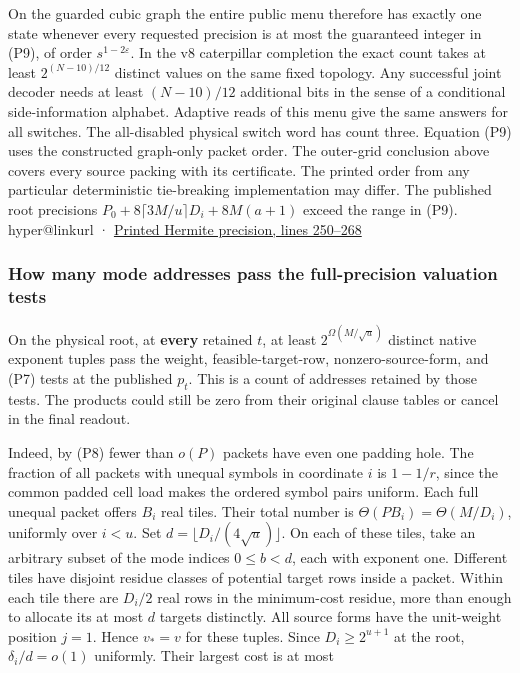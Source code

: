 \documentclass[11pt,a4paper]{article}
\makeatletter
\newcommand{\PaperSixCatalogue}[1]{\csname hyper@linkurl\endcsname{#1}{EVIDENCE_CATALOG.md}}
\newcommand{\PaperSixEvidence}[2]{\PaperSixCatalogue{#2}}
\makeatother
\begin{document}
On the guarded cubic graph the entire public menu therefore has exactly
one state whenever every requested precision is at most the guaranteed
integer in (P9), of order \(s^{1-2\varepsilon}\). In the v8 caterpillar
completion the exact count takes at least \(2^{(N-10)/12}\) distinct
values on the same fixed topology. Any successful joint decoder needs at
least \((N-10)/12\) additional bits in the sense of a conditional
side-information alphabet. Adaptive reads of this menu give the same
answers for all switches. The all-disabled physical switch word has
count three. Equation (P9) uses the constructed graph-only packet order.
The outer-grid conclusion above covers every source packing with its
certificate. The printed order from any particular deterministic
tie-breaking implementation may differ. The published root precisions
\(P_0+8\lceil3M/u\rceil D_i+8M(a+1)\) exceed the range in (P9).
\PaperSixEvidence{evidence/research_v8/applications/pooled_menu_barrier.md}{Range of
exact physical counts} ·
\href{https://github.com/openai/math/blob/main/preprints/The-Exponential-Time-Hypothesis-is-False-October-25-2026/build/quantitative-contraction.tex\#L250}{Printed
Hermite precision, lines 250--268}

\subsubsection{How many mode addresses pass the full-precision valuation
tests}\label{v9-how-many-mode-addresses-pass-the-full-precision-valuation-tests}

On the physical root, at \textbf{every} retained \(t\), at least
\(2^{\Omega(M/\sqrt{u})}\) distinct native exponent tuples pass the
weight, feasible-target-row, nonzero-source-form, and (P7) tests at the
published \(p_t\). This is a count of addresses retained by those tests.
The products could still be zero from their original clause tables or
cancel in the final readout.

Indeed, by (P8) fewer than \(o(P)\) packets have even one padding hole.
The fraction of all packets with unequal symbols in coordinate \(i\) is
\(1-1/r\), since the common padded cell load makes the ordered symbol
pairs uniform. Each full unequal packet offers \(B_i\) real tiles. Their
total number is \(\Theta(PB_i)=\Theta(M/D_i)\), uniformly over \(i<u\).
Set \(d=\lfloor D_i/(4\sqrt u)\rfloor\). On each of these tiles, take an
arbitrary subset of the mode indices \(0\le b<d\), each with exponent
one. Different tiles have disjoint residue classes of potential target
rows inside a packet. Within each tile there are \(D_i/2\) real rows in
the minimum-cost residue, more than enough to allocate its at most \(d\)
targets distinctly. All source forms have the unit-weight position
\(j=1\). Hence \(v_*=v\) for these tuples. Since \(D_i\ge2^{u+1}\) at
the root, \(\delta_i/d=o(1)\) uniformly. Their largest cost is at most
\end{document}
